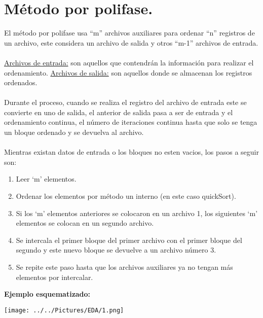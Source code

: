 \documentclass[12pt,letterpaper]{report}
\begin{document}
\section*{Método por polifase.}
El método por polifase usa “m” archivos auxiliares para ordenar “n” registros de un archivo, este considera un archivo de salida y otros “m-1” archivos de entrada.\\\\
\underline{Archivos de entrada:} son aquellos que contendrán la información para realizar el ordenamiento.
\underline{Archivos de salida:} son aquellos donde se almacenan los registros ordenados.\\\\
Durante el proceso, cuando se realiza el registro del archivo de entrada este se convierte en uno de salida, el anterior de salida pasa a ser de entrada y el ordenamiento continua, el número de iteraciones continua hasta que solo se tenga un bloque ordenado y se devuelva al archivo.\\\\
Mientras existan datos de entrada o los bloques no esten vacios, los pasos a seguir son:
\begin{enumerate}
    \item Leer ‘m’ elementos.
    \item Ordenar los elementos por método un interno (en este caso 		quickSort).
    \item Si los ‘m’ elementos anteriores se colocaron en un archivo 1, los siguientes ‘m’ elementos se colocan en un segundo archivo.
    \item Se intercala el primer bloque del primer archivo con el primer bloque del segundo y este nuevo bloque se devuelve a un archivo número 3.
    \item Se repite este paso hasta que los archivos auxiliares ya no tengan más elementos por intercalar.
\end{enumerate}
\textbf{Ejemplo esquematizado:}
\begin{center}
\texttt{[image: ../../Pictures/EDA/1.png]} 
\end{center}
\end{document}
